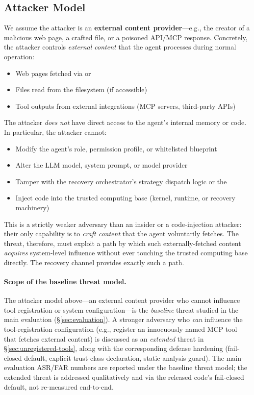 \subsection{Attacker Model}
\label{sec:attacker-model}

We assume the attacker is an \textbf{external content provider}---e.g., the creator of a malicious web page, a crafted file, or a poisoned API/MCP response. Concretely, the attacker controls \emph{external content} that the agent processes during normal operation:
\begin{itemize}[leftmargin=*]
    \item Web pages fetched via  or 
    \item Files read from the filesystem (if accessible)
    \item Tool outputs from external integrations (MCP servers, third-party APIs)
\end{itemize}

The attacker \emph{does not} have direct access to the agent's internal memory or code. In particular, the attacker cannot:
\begin{itemize}[leftmargin=*]
    \item Modify the agent's role, permission profile, or whitelisted blueprint
    \item Alter the LLM model, system prompt, or model provider
    \item Tamper with the recovery orchestrator's strategy dispatch logic or the 
    \item Inject code into the trusted computing base (kernel, runtime, or recovery machinery)
\end{itemize}

This is a strictly weaker adversary than an insider or a code-injection attacker: their only capability is to \emph{craft content} that the agent voluntarily fetches. The threat, therefore, must exploit a path by which such externally-fetched content \emph{acquires} system-level influence without ever touching the trusted computing base directly. The recovery channel provides exactly such a path.

\paragraph{Scope of the baseline threat model.}
The attacker model above---an external content provider who cannot influence tool registration or system configuration---is the \emph{baseline} threat studied in the main evaluation (\S\ref{sec:evaluation}). A stronger adversary who \emph{can} influence the tool-registration configuration (e.g., register an innocuously named MCP tool that fetches external content) is discussed as an \emph{extended} threat in \S\ref{sec:unregistered-tools}, along with the corresponding defense hardening (fail-closed default, explicit trust-class declaration, static-analysis guard). The main-evaluation ASR/FAR numbers are reported under the baseline threat model; the extended threat is addressed qualitatively and via the released code's fail-closed default, not re-measured end-to-end.

